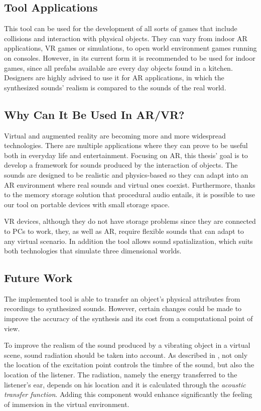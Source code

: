 \subsection{Tool Applications}
This tool can be used for the development of all sorts of games that include collisions and interaction with physical objects. They can vary from indoor \gls{AR} applications, \gls{VR} games or simulations, to open world environment games running on consoles. However, in its current form it is recommended to be used for indoor games, since all prefabs available are every day objects found in a kitchen. Designers are highly advised to use it for \gls{AR} applications, in which the synthesized sounds' realism is compared to the sounds of the real world.

\subsection{Why Can It Be Used In AR/VR?}
Virtual and augmented reality are becoming more and more widespread technologies. There are multiple applications where they can prove to be useful both in everyday life and entertainment. Focusing on \gls{AR}, this thesis' goal is to develop a framework for sounds produced by the interaction of objects. The sounds are designed to be realistic and physics-based so they can adapt into an \gls{AR} environment where real sounds and virtual ones coexist. Furthermore, thanks to the memory storage solution that procedural audio entails, it is possible to use our tool on portable devices with small storage space.

\gls{VR} devices, although they do not have storage problems since they are connected to PCs to work, they, as well as \gls{AR}, require flexible sounds that can adapt to any virtual scenario. In addition the tool allows sound spatialization, which suits both technologies that simulate three dimensional worlds.

\subsection{Future Work}


The implemented tool is able to transfer an object's physical attributes from recordings to synthesized sounds. However, certain changes could be made to improve the accuracy of the synthesis and its cost from a computational point of view.

To improve the realism of the sound produced by a vibrating object in a virtual scene, sound radiation should be taken into account. As described in \cite{corbett2007timbrefields}, not only the location of the excitation point controls the timbre of the sound, but also the location of the listener. The radiation, namely the energy transferred to the listener's ear, depends on his location and it is calculated through the \textit{acoustic transfer function}. Adding this component would enhance significantly the feeling of immersion in the virtual environment.

